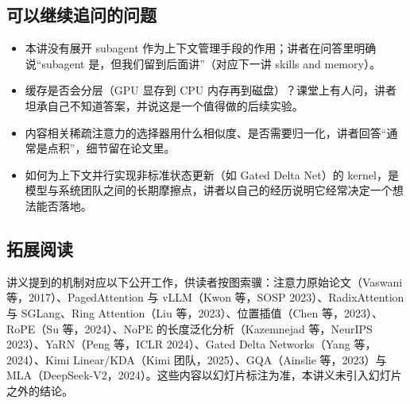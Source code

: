 \documentclass[a4paper]{article}
\begin{document}
\subsection{可以继续追问的问题}

\begin{itemize}
\item 本讲没有展开 subagent 作为上下文管理手段的作用；讲者在问答里明确说“subagent 是，但我们留到后面讲”（对应下一讲 skills and memory）。
\item 缓存是否会分层（GPU 显存到 CPU 内存再到磁盘）？课堂上有人问，讲者坦承自己不知道答案，并说这是一个值得做的后续实验。
\item 内容相关稀疏注意力的选择器用什么相似度、是否需要归一化，讲者回答“通常是点积”，细节留在论文里。
\item 如何为上下文并行实现非标准状态更新（如 Gated Delta Net）的 kernel，是模型与系统团队之间的长期摩擦点，讲者以自己的经历说明它经常决定一个想法能否落地。
\end{itemize}

\subsection{拓展阅读}
讲义提到的机制对应以下公开工作，供读者按图索骥：注意力原始论文（Vaswani 等，2017）、PagedAttention 与 vLLM（Kwon 等，SOSP 2023）、RadixAttention 与 SGLang、Ring Attention（Liu 等，2023）、位置插值（Chen 等，2023）、RoPE（Su 等，2024）、NoPE 的长度泛化分析（Kazemnejad 等，NeurIPS 2023）、YaRN（Peng 等，ICLR 2024）、Gated Delta Networks（Yang 等，2024）、Kimi Linear/KDA（Kimi 团队，2025）、GQA（Ainslie 等，2023）与 MLA（DeepSeek-V2，2024）。这些内容以幻灯片标注为准，本讲义未引入幻灯片之外的结论。
\end{document}
